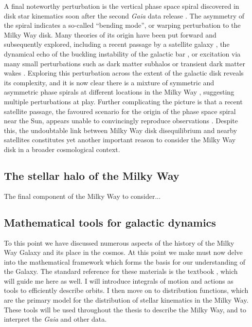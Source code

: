 A final noteworthy perturbation is the vertical phase space spiral discovered in disk star kinematics soon after the second \textit{Gaia} data release \parencite{antoja18}. The asymmetry of the spiral indicates a so-called ``bending mode'', or warping perturbation to the Milky Way disk. Many theories of its origin have been put forward and subsequently explored, including a recent passage by a satellite galaxy \parencite{laporte19}, the dynamical echo of the buckling instability of the galactic bar \parencite{khoperskov19}, or excitation via many small perturbations such as dark matter subhalos or transient dark matter wakes \parencite{tremaine23,grand23}. Exploring this perturbation across the extent of the galactic disk reveals its complexity, and it is now clear there is a mixture of symmetric and asymmetric phase spirals at different locations in the Milky Way \parencite{hunt22}, suggesting multiple perturbations at play. Further complicating the picture is that a recent satellite passage, the favoured scenario for the origin of the phase space spiral near the Sun, appears unable to convincingly reproduce observations \parencite{bennett21,bennett22}. Despite this, the undoubtable link between Milky Way disk disequilibrium and nearby satellites constitutes yet another important reason to consider the Milky Way disk in a broader cosmological context.


\subsection{The stellar halo of the Milky Way}

The final component of the Milky Way to consider...

\subsection{Mathematical tools for galactic dynamics}

To this point we have discussed numerous aspects of the history of the Milky Way Galaxy and its place in the cosmos. At this point we make must now delve into the mathematical framework which forms the basis for our understanding of the Galaxy. The standard reference for these materials is the textbook \textcite{binney08}, which will guide me here as well. I will introduce integrals of motion and actions as tools to efficiently describe orbits. I then move on to distribution functions, which are the primary model for the distribution of stellar kinematics in the Milky Way. These tools will be used throughout the thesis to describe the Milky Way, and to interpret the \textit{Gaia} and other data.

